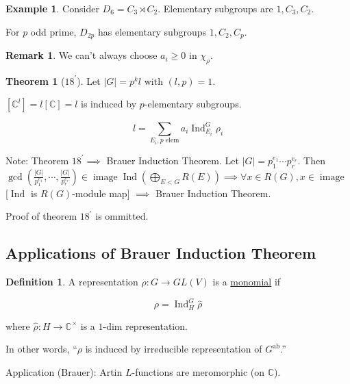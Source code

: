 \documentclass{article}
\theoremstyle{definition}
\newtheorem*{example}{Example}
\newtheorem*{definition}{Definition}
\newtheorem{theorem}{Theorem}
\newtheorem*{remark}{Remark}
\begin{document}
\begin{example}
    Consider \(D_6 = C_3 \rtimes C_2\). Elementary subgroups are \(1, C_3, C_2\).

    For \(p\) odd prime, \(D_{2p}\) has elementary subgroups \(1, C_2, C_p\).
\end{example}

\begin{remark}
    We can't always choose \(a_i \geq 0\) in \(\chi_{\rho}\).
\end{remark}

\begin{theorem}
    [\(18^{\prime}\)] Let \(\vert G \vert = p^k l\) with \((l,p)=1\).

    \([\mathbb{C}^l] = l[\mathbb{C}]=l\) is induced by \(p\)-elementary subgroups.

    \[
        l = \sum_{E_i, p \text{ elem}} a_i \operatorname{Ind}_{E_i}^G \rho_i
    \]
\end{theorem}

Note: Theorem \(18^{\prime} \implies\) Brauer Induction Theorem. Let \(\vert G \vert = p_1^{e_1} \cdots p_r^{e_r}\). Then \(\gcd\left( \frac{\vert G \vert}{p_1^{e_1}}, \cdots , \frac{\vert G \vert}{p_r^{e_r}} \right) \in \operatorname{image} \operatorname{Ind} \left( \bigoplus_{E < G} R(E) \right)  \implies \forall x\in R(G), x\in \operatorname{image}\) [\(\operatorname{Ind}\) is \(R(G)\)-module map] \(\implies\) Brauer Induction Theorem.

Proof of theorem \(18^{\prime} \) is ommitted.

\subsection*{Applications of Brauer Induction Theorem}

\begin{definition}
    A representation \(\rho: G \to GL(V)\) is a \underline{monomial} if

    \[
        \rho = \operatorname{Ind}_H^G \hat{\rho}
    \]

    where \(\hat{\rho} : H \to \mathbb{C}^\times\) is a \(1\)-dim  representation.

    In other words, ``\(\rho\) is induced by irreducible representation of \(G^{\operatorname{ab}}\).''

\end{definition}

Application (Brauer): Artin \(L\)-functions are meromorphic (on \(\mathbb{C}\)).
\end{document}
